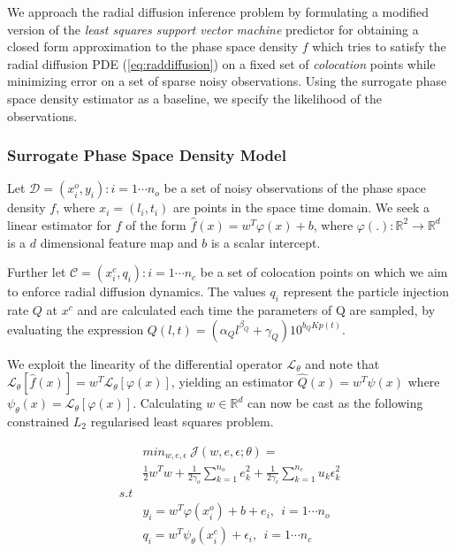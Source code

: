 We approach the radial diffusion inference problem by formulating a
modified version of the \emph{least squares support vector machine}
predictor for obtaining a closed form approximation to the phase space
density $f$ which tries to satisfy the radial diffusion PDE
(\cref{eq:raddiffusion}) on a fixed set of \emph{colocation} points while
minimizing error on a set of sparse noisy observations. 
Using the surrogate phase space density estimator as a baseline, we
specify the likelihood of the observations.


\subsubsection*{Surrogate Phase Space Density Model}

Let $\mathcal{D}={(x^{o}_{i}, y_{i}): i = 1 \cdots n_{o}}$ be a set of
noisy observations of the phase space density $f$, where $x_{i} =
(l_{i}, t_{i})$ are points in the space time domain. We seek a linear
estimator for $f$ of the form $\hat{f}(x) = w^{T}\varphi(x) + b$,
where $\varphi(.): \mathbb{R}^{2} \rightarrow \mathbb{R}^{d}$ is a $d$
dimensional feature map and $b$ is a scalar intercept.

Further let $\mathcal{C} ={(x^{c}_{i}, q_{i}): i = 1 \cdots n_{c}}$ be 
a set of colocation points on which we aim to enforce radial diffusion
dynamics. The values $q_{i}$ represent the particle injection rate $Q$ at $x^c$ and 
are calculated each time the parameters of Q are sampled, by evaluating the expression 
$Q(l,t) = (\alpha_{Q}l^{\beta_{Q}} + \gamma_{Q})10^{b_{Q}Kp(t)}$.

We exploit the linearity of the differential operator
$\mathcal{L}_{\theta}$ and note that $\mathcal{L}_{\theta} [\hat{f}(x)]
= w^{T} \mathcal{L}_{\theta}[\varphi(x)]$, yielding an estimator
$\hat{Q}(x) = w^{T}\psi(x)$ where $\psi_{\theta}(x) =
\mathcal{L}_{\theta}[\varphi(x)]$. Calculating $w \in \mathbb{R}^d$
can now be cast as the following constrained $L_2$ regularised 
least squares problem.

\begin{align}\label{eq:surrogate}
   & min_{w,e,\epsilon} \ \mathcal{J}(w,e,\epsilon;\theta) = \\
   & \frac{1}{2} w^{T}w + \frac{1}{2\gamma_{o}} \sum_{k = 1}^{n_{o}}{e^{2}_{k}} + \frac{1}{2\gamma_{c}} \sum_{k = 1}^{n_{c}}{u_{k} \epsilon^{2}_{k}} \\
  s.t &\nonumber \\
  & y_{i}  = w^{T}\varphi(x^{o}_{i}) + b + e_{i}, \ \ i = 1 \cdots n_{o} \\
  & q_{i} = w^{T}\psi_{\theta}(x^{c}_{i}) + \epsilon_{i}, \ \ i = 1 \cdots n_{c}
\end{align}

